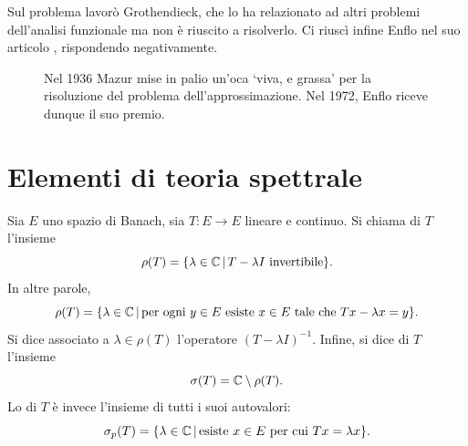 Sul problema lavorò Grothendieck, che lo ha relazionato ad altri problemi dell'analisi funzionale ma non è riuscito a risolverlo. Ci riuscì infine Enflo nel suo articolo \cite{enflo1973counterexample}, rispondendo negativamente.

\begin{figure}[h]
	\centering
	\caption{Nel 1936 Mazur mise in palio un'oca `viva, e grassa' per la risoluzione del problema dell'approssimazione. Nel 1972, Enflo riceve dunque il suo premio.}
\end{figure}

\section{Elementi di teoria spettrale}
\begin{definition}
	Sia $E$ uno spazio di Banach, sia $T:E \to E$ lineare e continuo. Si chiama  di $T$ l'insieme
	\begin{equation*}
		\rho(T) = \{\lambda \in \mathbb{C} \,|\, \text{$T-\lambda I$ invertibile} \}.
	\end{equation*}
	In altre parole,
	\begin{equation*}
		\rho(T) = \{\lambda \in \mathbb{C} \,|\, \text{per ogni $y \in E$ esiste $x \in E$ tale che $Tx - \lambda x = y$}\}.
	\end{equation*}
	Si dice  associato a $\lambda \in \rho(T)$ l'operatore $(T-\lambda I)^{-1}$. Infine, si dice  di $T$ l'insieme
	\begin{equation*}
		\sigma(T) = \mathbb{C} \setminus \rho(T).
	\end{equation*}
	Lo  di $T$ è invece l'insieme di tutti i suoi autovalori:
	\begin{equation*}
		\sigma_p(T) = \{ \lambda \in \mathbb{C} \,|\, \text{esiste $x \in E$ per cui $Tx = \lambda x$} \}.
	\end{equation*}
\end{definition}

